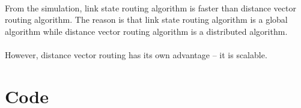 \documentclass[12pt]{article}
\begin{document}
\paragraph{}From the simulation, link state routing algorithm is faster than distance vector routing algorithm. The reason is that link state routing algorithm is a global algorithm while distance vector routing algorithm is a distributed algorithm. 
\paragraph{}However, distance vector routing has its own advantage -- it is scalable.



\section*{Code}
\end{document}
